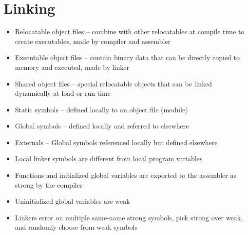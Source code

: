 \documentclass[twocolumn]{article}
\begin{document}
\section{Linking}
\begin{itemize}[noitemsep]
    \item Relocatable object files -- combine with other relocatables at compile time to create executables, made by compiler and assembler
    \item Executable object files -- contain binary data that can be directly copied to memory and executed, made by linker
    \item Shared object files -- special relocatable objects that can be linked dynamically at load or run time
    \item Static symbols -- defined locally to an object file (module)
    \item Global symbols -- defined locally and referred to elsewhere
    \item Externals -- Global symbols referenced locally but defined elsewhere
    \item Local linker symbols are different from local program variables
    \item Functions and initialized global variables are exported to the assembler as strong by the compiler
    \item Uninitialized global variables are weak
    \item Linkers error on multiple same-name strong symbols, pick strong over weak, and randomly choose from weak symbols
\end{itemize}
\end{document}
